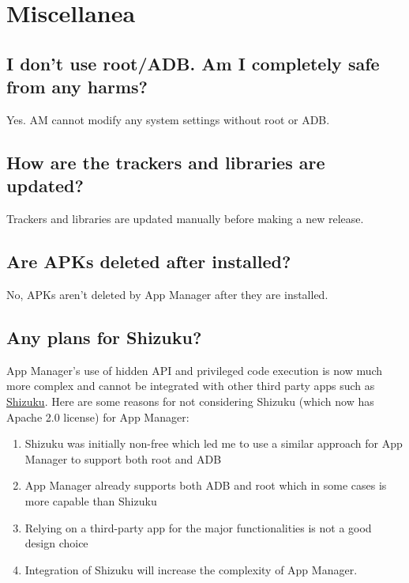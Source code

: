\section{Miscellanea}\label{sec:faq:miscellanea} %

\subsection{I don't use root/ADB. Am I completely safe from any harms?}\label{subsec:faq:no-root-no-harms} %
Yes. AM cannot modify any system settings without root or ADB\@.

\subsection{How are the trackers and libraries are updated?}\label{subsec:faq:how-trackers-libs-updated} %
Trackers and libraries are updated manually before making a new release.

\subsection{Are APKs deleted after installed?}\label{subsec:faq:apks-deleted-after-installed} %
No, APKs aren't deleted by App Manager after they are installed.

\subsection{Any plans for Shizuku?}\label{subsec:faq:shizuku-support} %
App Manager's use of hidden API and privileged code execution is now much more complex and cannot be integrated with
other third party apps such as \href{https://shizuku.rikka.app}{Shizuku}. Here are some reasons for not considering
Shizuku (which now has Apache 2.0 license) for App Manager:
\begin{enumerate}
    \item Shizuku was initially non-free which led me to use a similar approach for App Manager to support both root
    and ADB
    \item App Manager already supports both ADB and root which in some cases is more capable than Shizuku
    \item Relying on a third-party app for the major functionalities is not a good design choice
    \item Integration of Shizuku will increase the complexity of App Manager.
\end{enumerate}

